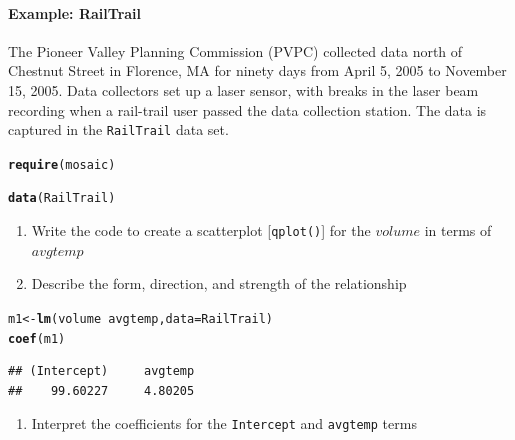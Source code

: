 \documentclass[10pt]{article}\usepackage[]{graphicx}\usepackage[]{color}
\makeatletter
\newcommand{\hlopt}[1]{\textcolor[rgb]{0,0,0}{#1}}%
\newcommand{\hlstd}[1]{\textcolor[rgb]{0.345,0.345,0.345}{#1}}%
\newcommand{\hlkwb}[1]{\textcolor[rgb]{0.69,0.353,0.396}{#1}}%
\newcommand{\hlkwc}[1]{\textcolor[rgb]{0.333,0.667,0.333}{#1}}%
\newcommand{\hlkwd}[1]{\textcolor[rgb]{0.737,0.353,0.396}{\textbf{#1}}}%
\newenvironment{kframe}{%
 \def\at@end@of@kframe{}%
 \ifinner\ifhmode%
  \def\at@end@of@kframe{\end{minipage}}%
  \begin{minipage}{\columnwidth}%
 \fi\fi%
 \def\FrameCommand##1{\hskip\@totalleftmargin \hskip-\fboxsep
 \colorbox{shadecolor}{##1}\hskip-\fboxsep
     \hskip-\linewidth \hskip-\@totalleftmargin \hskip\columnwidth}%
 \MakeFramed {\advance\hsize-\width
   \@totalleftmargin\z@ \linewidth\hsize
   \@setminipage}}%
 {\par\unskip\endMakeFramed%
 \at@end@of@kframe}
\newenvironment{knitrout}{}{} %
\newcommand{\cmd}[1]{\texttt{#1}}
\makeatother
\begin{document}
\paragraph{Example: RailTrail}

The Pioneer Valley Planning Commission (PVPC) collected data north of Chestnut Street in Florence, MA for ninety days from April 5, 2005 to November 15, 2005. Data collectors set up a laser sensor, with breaks in the laser beam recording when a rail-trail user passed the data collection station. The data is captured in the \cmd{RailTrail} data set.

\begin{knitrout}
\color{fgcolor}\begin{kframe}
\begin{alltt}
\hlkwd{require}\hlstd{(mosaic)}
\end{alltt}


{\ttfamily\noindent\color{warningcolor}{\#\# Warning: package 'dplyr' was built under R version 3.4.1}}\begin{alltt}
\hlkwd{data}\hlstd{(RailTrail)}
\end{alltt}
\end{kframe}
\end{knitrout}
\clearpage
\begin{enumerate}
  \itemsep0.6in
  \item Write the code to create a scatterplot [\cmd{qplot()}] for the $volume$ in terms of $avgtemp$
  \item Describe the form, direction, and strength of the relationship
  \vspace{0.6in}
\end{enumerate}

\begin{knitrout}\footnotesize
{}\color{fgcolor}\begin{kframe}
\begin{alltt}
\hlstd{m1} \hlkwb{<-} \hlkwd{lm}\hlstd{(volume}\hlopt{~}\hlstd{avgtemp,} \hlkwc{data}\hlstd{=RailTrail)}
\hlkwd{coef}\hlstd{(m1)}
\end{alltt}
\begin{verbatim}
## (Intercept)     avgtemp 
##    99.60227     4.80205
\end{verbatim}
\end{kframe}
\end{knitrout}
\begin{enumerate}
  \itemsep0.6in
  \item Interpret the coefficients for the \cmd{Intercept} and \cmd{avgtemp} terms
  \vspace{1in}
\end{enumerate}
\end{document}
